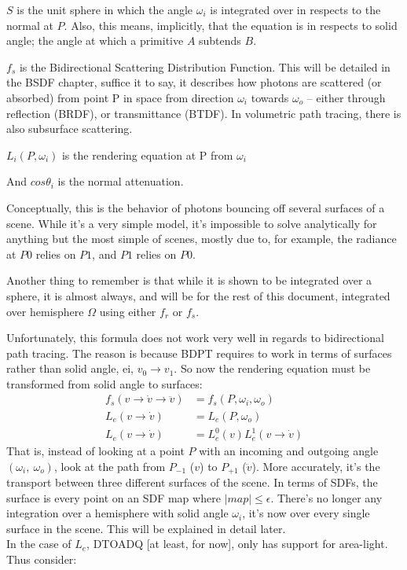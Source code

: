 \message{ !name(test.tex)}\documentclass{article}
\begin{document}
  	 
  	 $S$ is the unit sphere in which the angle $\omega_i$ is integrated over in respects to the normal at $P$. Also, this means, implicitly, that the equation is in respects to solid angle; the angle at which a primitive $A$ subtends $B$.
  	 
  	 $f_s$ is the Bidirectional Scattering Distribution Function. This will be detailed in the BSDF chapter, suffice it to say, it describes how photons are scattered (or absorbed) from point P in space from direction $\omega_i$ towards $\omega_o$ -- either through reflection (BRDF), or transmittance (BTDF). In volumetric path tracing, there is also subsurface scattering.
  	 
  	 $L_i(P, \omega_i)$ is the rendering equation at P from $\omega_i$
  	 
  	 And $cos\theta_i$ is the normal attenuation.
  	 
  Conceptually, this is the behavior of photons bouncing off several surfaces of a scene. While it's a very simple model, it's impossible to solve analytically for anything but the most simple of scenes, mostly due to, for example, the radiance at $P0$ relies on $P1$, and $P1$ relies on $P0$.
  
  Another thing to remember is that while it is shown to be integrated over a sphere, it is almost always, and will be for the rest of this document, integrated over hemisphere $\Omega$ using either $f_r$ or $f_s$.
  
  
  Unfortunately, this formula does not work very well in regards to bidirectional path tracing. The reason is because BDPT requires to work in terms of surfaces rather than solid angle, ei, $v_0 \rightarrow v_1$. So now the rendering equation must be transformed from solid angle to surfaces:
  \begin{align}
    f_s(v \rightarrow \dot{v} \rightarrow \ddot{v}) &= f_s(P, \omega_i,
                                                      \omega_o)\\
    L_e(v \rightarrow \dot{v}) &= L_e(P, \omega_o)\\
    L_e(v \rightarrow \dot{v}) &= L_e^0(v) L_e^1(v \rightarrow \dot{v})
  \end{align}
    That is, instead of looking at a point $P$ with an incoming and outgoing
    angle $(\omega_i,\:\omega_o)$, look at the path from $P_{-1}$ ($v$) to
    $P_{+1}$ ($\ddot{v}$). More accurately, it's the transport between
    three different surfaces of the scene. In terms of SDFs, the surface
    is every point on an SDF map where $|map| \leq \epsilon$. There's no longer
    any integration over a hemisphere with solid angle $\omega_i$, it's now over
    every single surface in the scene. This will be explained in detail later.
\\
    In the case of $L_e$,
    DTOADQ [at least, for now], only has support for area-light. Thus consider:
\end{document}
